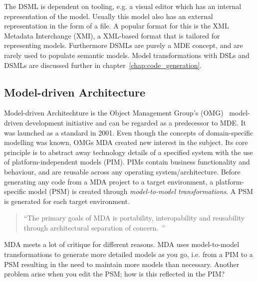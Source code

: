 The DSML is dependent on tooling, e.g. a visual editor which has an internal representation of the model. Usually this model also has an external representation in the form of a file. A popular format for this is the XML Metadata Interchange (XMI), a XML-based format that is tailored for representing models. Furthermore DSMLs are purely a MDE concept, and are rarely used to populate semantic models.
Model transformations with DSLs and DSMLs are discussed further in chapter~\ref{chap:code_generation}.




\subsection{Model-driven Architecture}
Model-driven Architechture is the Object Management Group's (OMG)~\cite{MDA} model-driven development initiative and can be regarded as a predecessor to MDE. It was launched as a standard in 2001. Even though the concepts of domain-specific modelling was known, OMGs MDA created new interest in the subject. Its core principle is to abstract away technology details of a specified system with the use of platform-independent models (PIM). PIMs contain business functionality and behaviour, and are reusable across any operating system/architecture. Before generating any code from a MDA project to a target environment, a platform-specific model (PSM) is created through \emph{model-to-model transformations}. A PSM is generated for each target environment. 
\begin{quote}
``The primary goals of MDA is portability, interopability and reusability through architectural separation of concern.~\cite{MDA}''
\end{quote}
MDA meets a lot of critique for different reasons. MDA uses model-to-model transformations to generate more detailed models as you go, i.e. from a PIM to a PSM resulting in the need to maintain more models than necessary. Another problem arise when you edit the PSM; how is this reflected in the PIM?

